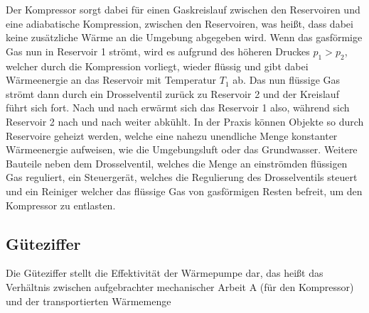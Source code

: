   Der Kompressor sorgt dabei für einen Gaskreislauf zwischen den Reservoiren und eine adiabatische Kompression, zwischen den Reservoiren, was heißt, dass dabei keine zusätzliche Wärme an die Umgebung abgegeben wird.
  Wenn das gasförmige Gas nun in Reservoir 1 strömt, wird es aufgrund des höheren Druckes $p_1 > p_2$, welcher durch die Kompression vorliegt, wieder flüssig und gibt dabei Wärmeenergie an das Reservoir mit Temperatur $T_1$ ab. Das nun flüssige Gas strömt dann durch ein Drosselventil zurück zu Reservoir 2 und der Kreislauf führt sich fort.
  Nach und nach erwärmt sich das Reservoir 1 also, während sich Reservoir 2 nach und nach weiter abkühlt.
  In der Praxis können Objekte so durch Reservoire geheizt werden, welche eine nahezu unendliche Menge konstanter Wärmeenergie aufweisen, wie die Umgebungsluft oder das Grundwasser.
  Weitere Bauteile neben dem Drosselventil, welches die Menge an einströmden flüssigen Gas reguliert, ein Steuergerät, welches die Regulierung des Drosselventils steuert und ein Reiniger welcher das flüssige Gas von gasförmigen Resten befreit, um den Kompressor zu entlasten.
  \subsection{Güteziffer}
    Die Güteziffer stellt die Effektivität der Wärmepumpe dar, das heißt das Verhältnis zwischen aufgebrachter mechanischer Arbeit A (für den Kompressor) und der transportierten Wärmemenge 


